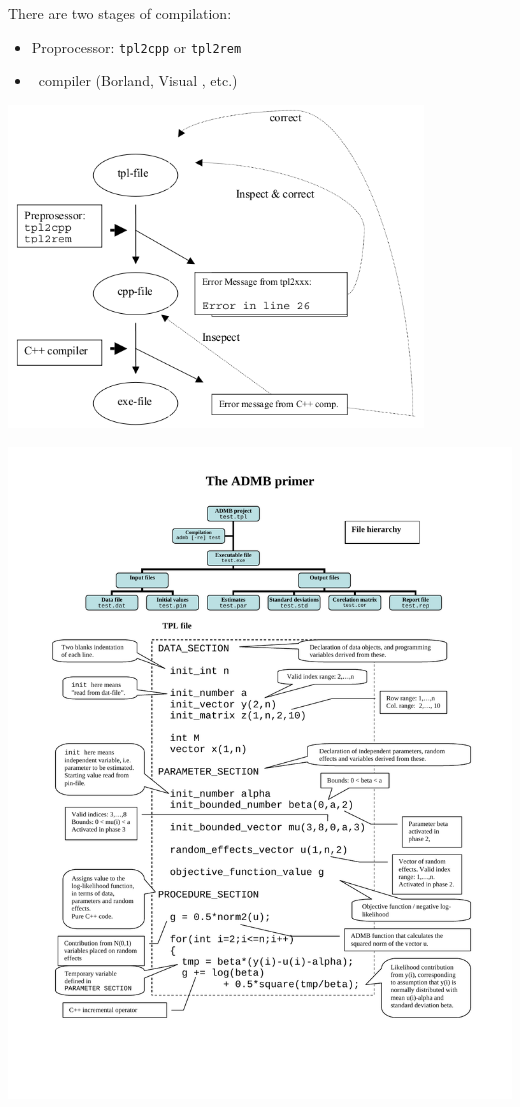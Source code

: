\documentclass{admbmanual}
\begin{document}
\noindent There are two stages of compilation:
\begin{itemize}
  \item Proprocessor: \texttt{tpl2cpp} or \texttt{tpl2rem}
  \item \cplus\ compiler (Borland, Visual \cplus, etc.)
\end{itemize}
\begin{center}
\includegraphics[width=11cm]{compiling-diagram.png}
\end{center}

\hskip-2pc\includegraphics[width=18cm]{ADMBprim.pdf}%




\printindex
\end{document}
